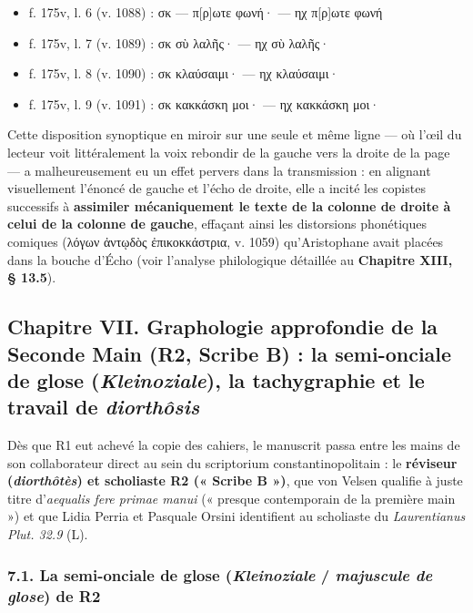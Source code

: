 \documentclass[11pt, a4paper, twoside]{article}
\renewcommand{\_}{\origunderscore\penalty0\relax}
\renewcommand{\texttt}[1]{#1}
\newcommand{\Run}{\textbf{R}\textsuperscript{1}}
\newcommand{\Rdeux}{\textbf{R}\textsuperscript{2}}
\newcommand{\inRas}[2]{[\kern-0.15em[#1]\kern-0.15em]#2}
\def\Run{R1}%
\def\Rdeux{R2}%
\def\inRas#1#2{[#1]#2}%
\begin{document}
\begin{itemize}[leftmargin=1.5em, itemsep=2pt]
\begin{itemize}[leftmargin=1.5em, itemsep=1pt]
  \item \texttt{f. 175v}, l. 6 (\texttt{v. 1088}) : \texttt{σκ — π\inRas{ρ}{}ωτε φωνή·} \quad \texttt{— ηχ π\inRas{ρ}{}ωτε φωνή}
  \item \texttt{f. 175v}, l. 7 (\texttt{v. 1089}) : \texttt{σκ σὺ λαλῆς·} \quad\quad \texttt{— ηχ σὺ λαλῆς·}
  \item \texttt{f. 175v}, l. 8 (\texttt{v. 1090}) : \texttt{σκ κλαύσαιμι·} \quad\quad \texttt{— ηχ κλαύσαιμι·}
    \item \texttt{f. 175v}, l. 9 (\texttt{v. 1091}) : \texttt{σκ κακκάσκη μοι·} \quad \texttt{— ηχ κακκάσκη μοι·}
  \end{itemize}
\end{itemize}

Cette disposition synoptique en miroir sur une seule et même ligne — où l'œil du lecteur voit littéralement la voix rebondir de la gauche vers la droite de la page — a malheureusement eu un effet pervers dans la transmission : en alignant visuellement l'énoncé de gauche et l'écho de droite, elle a incité les copistes successifs à \textbf{assimiler mécaniquement le texte de la colonne de droite à celui de la colonne de gauche}, effaçant ainsi les distorsions phonétiques comiques (\texttt{λόγων ἀντῳδὸς ἐπικοκκάστρια}, v. 1059) qu'Aristophane avait placées dans la bouche d'Écho (voir l'analyse philologique détaillée au \textbf{Chapitre XIII, § 13.5}).



\subsection{Chapitre VII. Graphologie approfondie de la Seconde Main (\texorpdfstring{\Rdeux{}}{R2}, Scribe B) : la semi-onciale de glose (\textit{Kleinoziale}), la tachygraphie et le travail de \textit{diorthôsis}}

Dès que \Run{} eut achevé la copie des cahiers, le manuscrit passa entre les mains de son collaborateur direct au sein du scriptorium constantinopolitain : le \textbf{réviseur (\textit{diorthôtès}) et scholiaste \Rdeux{} (« Scribe B »)}, que von Velsen qualifie à juste titre d'\textit{aequalis fere primae manui} (« presque contemporain de la première main ») et que Lidia Perria et Pasquale Orsini identifient au scholiaste du \textit{Laurentianus Plut. 32.9} (\textnormal{L}).


\subsubsection{7.1. La semi-onciale de glose (\textit{Kleinoziale} / \textit{majuscule de glose}) de \Rdeux{}}
\end{document}
